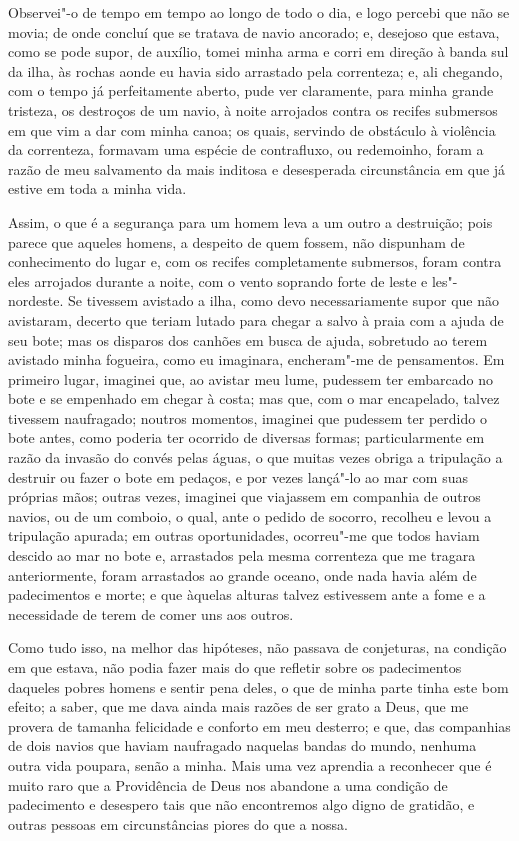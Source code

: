 Observei"-o de tempo em tempo ao longo de todo o dia, e logo percebi que
não se movia; de onde concluí que se tratava de navio ancorado; e,
desejoso que estava, como se pode supor, de auxílio, tomei minha arma e
corri em direção à banda sul da ilha, às rochas aonde eu havia sido
arrastado pela correnteza; e, ali chegando, com o tempo já perfeitamente
aberto, pude ver claramente, para minha grande tristeza, os destroços de
um navio, à noite arrojados contra os recifes submersos em que vim a dar
com minha canoa; os quais, servindo de obstáculo à violência da
correnteza, formavam uma espécie de contrafluxo, ou redemoinho, foram a
razão de meu salvamento da mais inditosa e desesperada circunstância em
que já estive em toda a minha vida.

Assim, o que é a segurança para um homem leva a um outro a destruição;
pois parece que aqueles homens, a despeito de quem fossem, não dispunham
de conhecimento do lugar e, com os recifes completamente submersos,
foram contra eles arrojados durante a noite, com o vento soprando forte
de leste e les"-nordeste. Se tivessem avistado a ilha, como devo
necessariamente supor que não avistaram, decerto que teriam lutado para
chegar a salvo à praia com a ajuda de seu bote; mas os disparos dos
canhões em busca de ajuda, sobretudo ao terem avistado minha fogueira,
como eu imaginara, encheram"-me de pensamentos. Em primeiro lugar,
imaginei que, ao avistar meu lume, pudessem ter embarcado no bote e se
empenhado em chegar à costa; mas que, com o mar encapelado, talvez
tivessem naufragado; noutros momentos, imaginei que pudessem ter perdido
o bote antes, como poderia ter ocorrido de diversas formas;
particularmente em razão da invasão do convés pelas águas, o que muitas
vezes obriga a tripulação a destruir ou fazer o bote em pedaços, e por
vezes lançá"-lo ao mar com suas próprias mãos; outras vezes, imaginei que
viajassem em companhia de outros navios, ou de um comboio, o qual, ante
o pedido de socorro, recolheu e levou a tripulação apurada; em outras
oportunidades, ocorreu"-me que todos haviam descido ao mar no bote e,
arrastados pela mesma correnteza que me tragara anteriormente, foram
arrastados ao grande oceano, onde nada havia além de padecimentos e
morte; e que àquelas alturas talvez estivessem ante a fome e a
necessidade de terem de comer uns aos outros.

Como tudo isso, na melhor das hipóteses, não passava de conjeturas, na
condição em que estava, não podia fazer mais do que refletir sobre os
padecimentos daqueles pobres homens e sentir pena deles, o que de minha
parte tinha este bom efeito; a saber, que me dava ainda mais razões de
ser grato a Deus, que me provera de tamanha felicidade e conforto em meu
desterro; e que, das companhias de dois navios que haviam naufragado
naquelas bandas do mundo, nenhuma outra vida poupara, senão a minha.
Mais uma vez aprendia a reconhecer que é muito raro que a Providência de
Deus nos abandone a uma condição de padecimento e desespero tais que não
encontremos algo digno de gratidão, e outras pessoas em circunstâncias
piores do que a nossa.

